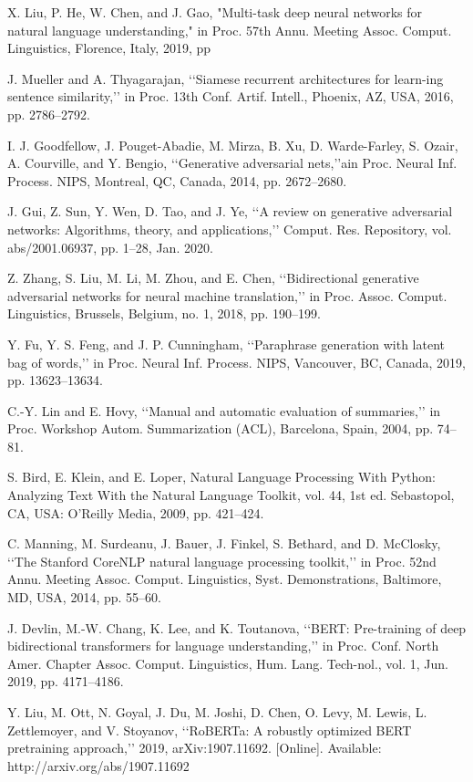 \documentclass[conference]{IEEEtran}
\begin{document}
\begin{thebibliography}{00}
 X. Liu, P. He, W. Chen, and J. Gao, "Multi-task deep neural networks for natural language understanding," in Proc. 57th Annu. Meeting Assoc. Comput. Linguistics, Florence, Italy, 2019, pp

 J. Mueller and A. Thyagarajan, ‘‘Siamese recurrent architectures for learn-ing sentence similarity,’’ in Proc. 13th Conf. Artif. Intell., Phoenix, AZ, USA, 2016, pp. 2786–2792.

I. J. Goodfellow, J. Pouget-Abadie, M. Mirza, B. Xu, D. Warde-Farley, S. Ozair, A. Courville, and Y. Bengio, ‘‘Generative adversarial nets,’’ain Proc. Neural Inf. Process. NIPS, Montreal, QC, Canada, 2014, pp. 2672–2680.

 J. Gui, Z. Sun, Y. Wen, D. Tao, and J. Ye, ‘‘A review on generative adversarial networks: Algorithms, theory, and applications,’’ Comput. Res. Repository, vol. abs/2001.06937, pp. 1–28, Jan. 2020.

 Z. Zhang, S. Liu, M. Li, M. Zhou, and E. Chen, ‘‘Bidirectional generative adversarial networks for neural machine translation,’’ in Proc. Assoc. Comput. Linguistics, Brussels, Belgium, no. 1, 2018, pp. 190–199.

 Y. Fu, Y. S. Feng, and J. P. Cunningham, ‘‘Paraphrase generation with latent bag of words,’’ in Proc. Neural Inf. Process. NIPS, Vancouver, BC, Canada, 2019, pp. 13623–13634.

  C.-Y. Lin and E. Hovy, ‘‘Manual and automatic evaluation of summaries,’’ in Proc. Workshop Autom. Summarization (ACL), Barcelona, Spain, 2004, pp. 74–81.

 S. Bird, E. Klein, and E. Loper, Natural Language Processing With Python: Analyzing Text With the Natural Language Toolkit, vol. 44, 1st ed. Sebastopol, CA, USA: O’Reilly Media, 2009, pp. 421–424.

 C. Manning, M. Surdeanu, J. Bauer, J. Finkel, S. Bethard, and D. McClosky, ‘‘The Stanford CoreNLP natural language processing toolkit,’’ in Proc. 52nd Annu. Meeting Assoc. Comput. Linguistics, Syst. Demonstrations, Baltimore, MD, USA, 2014, pp. 55–60.

 J. Devlin, M.-W. Chang, K. Lee, and K. Toutanova, ‘‘BERT: Pre-training of deep bidirectional transformers for language understanding,’’ in Proc. Conf. North Amer. Chapter Assoc. Comput. Linguistics, Hum. Lang. Tech-nol., vol. 1, Jun. 2019, pp. 4171–4186.

 Y. Liu, M. Ott, N. Goyal, J. Du, M. Joshi, D. Chen, O. Levy, M. Lewis, L. Zettlemoyer, and V. Stoyanov, ‘‘RoBERTa: A robustly optimized BERT pretraining approach,’’ 2019, arXiv:1907.11692. [Online]. Available: http://arxiv.org/abs/1907.11692


\end{thebibliography}
\end{document}
